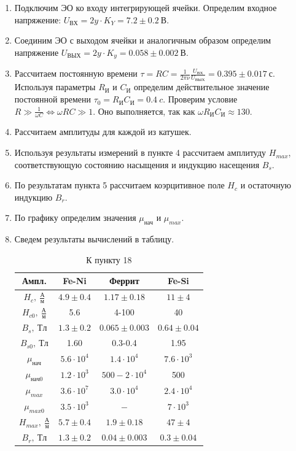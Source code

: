 \documentclass[14pt, a4paper]{report}
\begin{document}
\begin{enumerate}
\item Подключим ЭО ко входу интегрирующей ячейки. Определим входное напряжение: $U_{ВХ}=2y\cdot K_Y=7.2\pm0.2\ В.$

\item Соединим ЭО с выходом ячейки и аналогичным образом определим напряжение $U_{ВЫХ}=2y\cdot K_y=0.058\pm0.002\ В.$

\item Рассчитаем постоянную времени $\tau=RC=\frac{1}{2\pi\nu}\frac{U_{ВХ}}{U_{ВЫХ}}=0.395\pm0.017\ с$. Используя параметры $R_И$ и $C_И$ определим действительное значение постоянной времени $\tau_0=R_ИC_И=0.4\ c$. Проверим условие $R\gg\frac{1}{\omega C}\Leftrightarrow\omega RC\gg1$. Оно выполняется, так как $\omega R_ИC_И\approx130$.

\item Рассчитаем амплитуды для каждой из катушек.

\item Используя результаты измерений в пункте 4 рассчитаем амплитуду $H_{max}$, соответствующую состоянию насыщения и индукцию насещения $B_s$.

\item По результатам пункта 5 рассчитаем коэрцитивное поле $H_c$ и остаточную индукцию $B_r$.

\item По графику определим значения $\mu_{нач}$ и $\mu_{max}$.

\item Сведем результаты вычислений в таблицу.

\begin{table}[h!]
\centering
\begin{tabular}{| c | c | c | c |}
\hline
Ампл. & Fe-Ni & Феррит & Fe-Si \\
\hline
$H_c,\ \frac{А}{м}	$ & $4.9\pm0.4$ & $1.17\pm0.18$ & $11\pm4$ \\
$H_{c0},\ \frac{А}{м}$ & 5.6 & 4-100 & 40 \\
\hline
$B_s,\ Тл$ & $1.3\pm0.2$ & $0.065\pm0.003$ & $0.64\pm0.04$ \\
$B_{s0},\ Тл$ & 1.60 & 0.3-0.4 & 1.95 \\
\hline
$\mu_{нач}$ & $5.6\cdot10^4$ & $1.4\cdot10^4$ & $7.6\cdot10^3$ \\
$\mu_{нач0}$ & $1.2\cdot10^3$ & $500-2\cdot10^4$ & 500 \\
\hline
$\mu_{max}$ & $3.6\cdot10^7$ & $3.0\cdot10^4$ & $2.4\cdot10^4$ \\
$\mu_{max0}$ & $3.5\cdot10^3$ & $-$ & $7\cdot10^3$ \\
\hline
$H_{max},\ \frac{А}{м}$ & $5.7\pm0.4$ & $1.9\pm0.18$ & $47\pm4$ \\
\hline
$B_r,\ Тл$ & $1.3\pm0.2$ & $0.04\pm0.003$ & $0.3\pm0.04$ \\
\hline

\end{tabular}
\caption{К пункту 18}
\end{table}

\end{enumerate}
\end{document}
